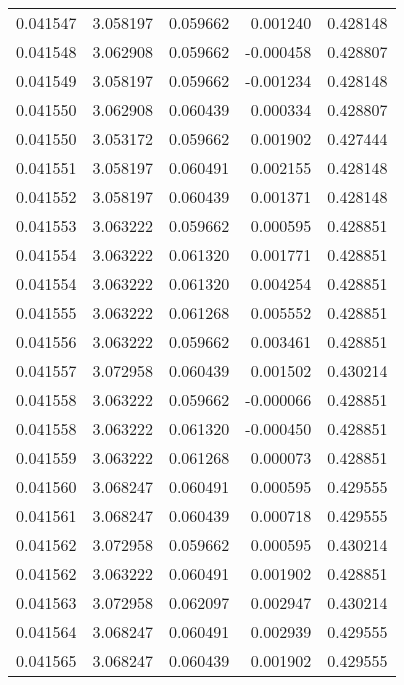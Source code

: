 \begin{tabular}{lrrrr}
0.041547    &  3.058197 &  0.059662 &  0.001240 &             0.428148 \\
0.041548    &  3.062908 &  0.059662 & -0.000458 &             0.428807 \\
0.041549    &  3.058197 &  0.059662 & -0.001234 &             0.428148 \\
0.041550    &  3.062908 &  0.060439 &  0.000334 &             0.428807 \\
0.041550    &  3.053172 &  0.059662 &  0.001902 &             0.427444 \\
0.041551    &  3.058197 &  0.060491 &  0.002155 &             0.428148 \\
0.041552    &  3.058197 &  0.060439 &  0.001371 &             0.428148 \\
0.041553    &  3.063222 &  0.059662 &  0.000595 &             0.428851 \\
0.041554    &  3.063222 &  0.061320 &  0.001771 &             0.428851 \\
0.041554    &  3.063222 &  0.061320 &  0.004254 &             0.428851 \\
0.041555    &  3.063222 &  0.061268 &  0.005552 &             0.428851 \\
0.041556    &  3.063222 &  0.059662 &  0.003461 &             0.428851 \\
0.041557    &  3.072958 &  0.060439 &  0.001502 &             0.430214 \\
0.041558    &  3.063222 &  0.059662 & -0.000066 &             0.428851 \\
0.041558    &  3.063222 &  0.061320 & -0.000450 &             0.428851 \\
0.041559    &  3.063222 &  0.061268 &  0.000073 &             0.428851 \\
0.041560    &  3.068247 &  0.060491 &  0.000595 &             0.429555 \\
0.041561    &  3.068247 &  0.060439 &  0.000718 &             0.429555 \\
0.041562    &  3.072958 &  0.059662 &  0.000595 &             0.430214 \\
0.041562    &  3.063222 &  0.060491 &  0.001902 &             0.428851 \\
0.041563    &  3.072958 &  0.062097 &  0.002947 &             0.430214 \\
0.041564    &  3.068247 &  0.060491 &  0.002939 &             0.429555 \\
0.041565    &  3.068247 &  0.060439 &  0.001902 &             0.429555 \\

\end{tabular}
